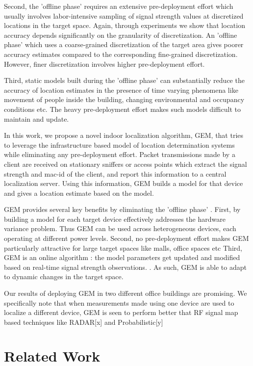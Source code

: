 \documentclass{Localization-PaperWriteupDraft}
\begin{document}
Second, the 'offline phase' requires an extensive pre-deployment effort which usually involves labor-intensive sampling of signal strength values at discretized locations in the target space. Again, through experiments we show that location accuracy depends significantly on the granularity of discretization. An 'offline phase'  which uses a coarse-grained discretization of the target area gives poorer accuracy estimates compared to the corresponding fine-grained discretization. However, finer discretization involves higher pre-deployment effort.

Third, static models built during the 'offline phase' can substantially reduce the accuracy of location estimates in the presence of time varying phenomena like movement of people inside the building, changing environmental and occupancy conditions etc. The heavy pre-deployment effort makes such models difficult to maintain and update. 

In this work, we propose a novel indoor localization algorithm, GEM, that tries to leverage the infrastructure based model of location determination systems while eliminating any pre-deployment effort. Packet transmissions made by a client are received on stationary sniffers or access points which extract the signal strength and mac-id of the client, and report this information to a central localization server. Using this information, GEM builds a model for that device and gives a location estimate based on the model. 

GEM provides several key benefits by eliminating the 'offline phase' . First, by building a model for each target device effectively addresses the hardware variance problem. Thus GEM can be used across heterogeneous devices, each operating at different power levels.  Second, no pre-deployment effort makes GEM particularly attractive for large target spaces like malls, office spaces etc  Third, GEM is an online algorithm : the model parameters get updated and modified based on real-time signal strength observations. . As such, GEM is able to adapt to dynamic changes in the target space.

Our results of deploying GEM in two different office buildings are promising. We specifically note that when measurements made using one device are used to localize a different device,  GEM is seen to perform better that RF signal map based techniques like RADAR[x] and Probabilistic[y]

\section{Related Work}
\label{sec:relatedwork}
\end{document}
